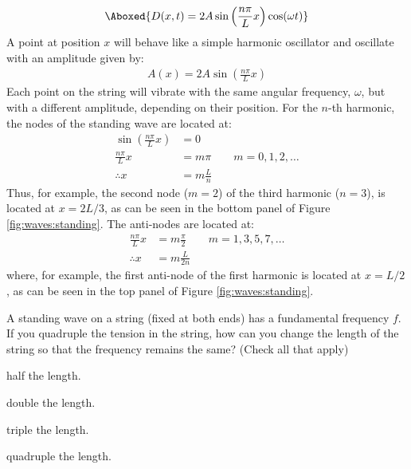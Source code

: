 \begin{align}
\Aboxed{D(x,t)=2A\sin\left(\frac{n\pi}{L}x\right)\cos(\omega t) }
\end{align}
A point at position $x$ will behave like a simple harmonic oscillator and oscillate with an amplitude given by:
\begin{align*}
A(x) = 2A\sin\left(\frac{n\pi}{L}x\right)
\end{align*}
Each point on the string will vibrate with the same angular frequency, $\omega$, but with a different amplitude, depending on their position. For the $n$-th harmonic, the nodes of the standing wave are located at:
\begin{align*}
\sin\left(\frac{n\pi}{L}x\right) &=0\\
\frac{n\pi}{L}x &= m\pi \quad\quad m=0,1,2,\dots\\
\therefore x &= m\frac{L}{n} 
\end{align*}
Thus, for example, the second node ($m=2$) of the third harmonic ($n=3$), is located at $x=2L/3$, as can be seen in the bottom panel of Figure \ref{fig:waves:standing}. The anti-nodes are located at:
\begin{align*}
\frac{n\pi}{L}x &= m\frac{\pi}{2} \quad\quad m=1,3,5,7,\dots\\
\therefore x&=m\frac{L}{2n}
\end{align*}
where, for example, the first anti-node of the first harmonic is located at $x=L/2$, as can be seen in the top panel of Figure \ref{fig:waves:standing}.

\begin{checkpoint}\begin{MCquestion}{A standing wave on a string (fixed at both ends) has a fundamental frequency $f$. If you quadruple the tension in the string, how can you change the length of the string so that the frequency remains the same? (Check all that apply)}
\item half the length.
\item double the length. \correct
\item triple the length. 
\item quadruple the length. \correct
\end{MCquestion}
\end{checkpoint}

